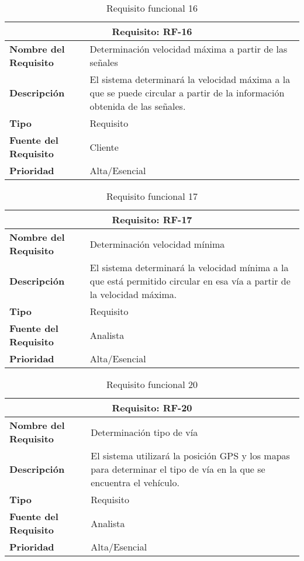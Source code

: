 \begin{table}[H]
\begin{center}
\begin{tabular}{p{} p{7cm}}
\multicolumn{2}{c}{\textbf{Requisito: RF-16} } \\
\hline \hline
\textbf{Nombre del Requisito} & Determinación velocidad máxima a partir de las señales \\
\hline
\textbf{Descripción} & El sistema determinará la velocidad máxima a la que se puede circular a partir de la información obtenida de las señales.\\
\hline
\textbf{Tipo} & Requisito \\
\hline
\textbf{Fuente del Requisito} & Cliente \\
\hline
\textbf{Prioridad} & Alta/Esencial \\ \hline
\end{tabular}
\caption{Requisito funcional 16}
\label{tab:RF-16}
\end{center}
\end{table}

\begin{table}[H]
\begin{center}
\begin{tabular}{p{} p{7cm}}
\multicolumn{2}{c}{\textbf{Requisito: RF-17} } \\
\hline \hline
\textbf{Nombre del Requisito} & Determinación velocidad mínima \\
\hline
\textbf{Descripción} &  El sistema determinará la velocidad mínima a la que está permitido circular en esa vía a partir de la velocidad máxima.\\
\hline
\textbf{Tipo} & Requisito \\
\hline
\textbf{Fuente del Requisito} & Analista \\
\hline
\textbf{Prioridad} & Alta/Esencial \\ \hline
\end{tabular}
\caption{Requisito funcional 17}
\label{tab:RF-17}
\end{center}
\end{table}

\begin{table}[H]
\begin{center}
\begin{tabular}{p{} p{7cm}}
\multicolumn{2}{c}{\textbf{Requisito: RF-20} } \\
\hline \hline
\textbf{Nombre del Requisito} & Determinación tipo de vía \\
\hline
\textbf{Descripción} & El sistema utilizará la posición GPS y los mapas para determinar el tipo de vía en la que se encuentra el vehículo. \\
\hline
\textbf{Tipo} & Requisito \\
\hline
\textbf{Fuente del Requisito} & Analista \\
\hline
\textbf{Prioridad} & Alta/Esencial \\ \hline
\end{tabular}
\caption{Requisito funcional 20}
\label{tab:RF-20}
\end{center}
\end{table}

